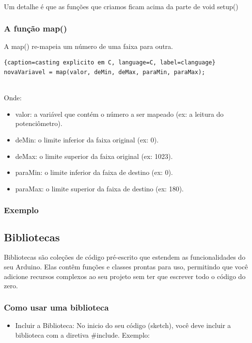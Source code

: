 \documentclass{report}
\begin{document}
	Um detalhe é que as funções que criamos ficam acima da parte de void setup()
	
	\subsubsection{A função map()}
	A map() re-mapeia um número de uma faixa para outra.
	
	\begin{center}
		
		\begin{lstlisting}{caption=casting explicito em C, language=C, label=clanguage}
novaVariavel = map(valor, deMin, deMax, paraMin, paraMax);
			
		\end{lstlisting}
	\end{center}
	
	Onde:
	
	\begin{itemize}
		\item valor: a variável que contém o número a ser mapeado (ex: a leitura do potenciômetro).
		\item deMin: o limite inferior da faixa original (ex: 0).
		\item deMax: o limite superior da faixa original (ex: 1023).
		\item paraMin: o limite inferior da faixa de destino (ex: 0).
		\item paraMax: o limite superior da faixa de destino (ex: 180).
	\end{itemize}
	
	
	
	\subsubsection{Exemplo}
	\subsection{Bibliotecas}
	Bibliotecas são coleções de código pré-escrito que estendem as funcionalidades do seu Arduino. Elas contêm funções e classes prontas para uso, permitindo que você adicione recursos complexos ao seu projeto sem ter que escrever todo o código do zero.
	\subsubsection{Como usar uma biblioteca}
	\begin{itemize}
		\item Incluir a Biblioteca: No inicio do seu código (sketch), você deve incluir a biblioteca com a diretiva \#include. Exemplo:
		
		
	\end{itemize}
	
\end{document}
